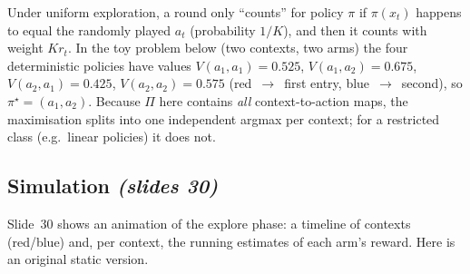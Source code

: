 \documentclass[11pt,a4paper]{article}
\newcommand{\slides}[1]{\emph{(slides #1)}}
\theoremstyle{plain}
\theoremstyle{definition}
\theoremstyle{remark}
\begin{document}
\begin{intuition}
Under uniform exploration, a round only ``counts'' for policy $\pi$ if $\pi(x_t)$ happens to equal the randomly played $a_t$ (probability $1/K$), and then it counts with weight $K r_t$.
In the toy problem below (two contexts, two arms) the four deterministic policies have values
$V(a_1,a_1)=0.525$, $V(a_1,a_2)=0.675$, $V(a_2,a_1)=0.425$, $V(a_2,a_2)=0.575$ (red~$\to$~first entry, blue~$\to$~second), so $\pi^\star=(a_1,a_2)$.
Because $\Pi$ here contains \emph{all} context-to-action maps, the maximisation splits into one independent argmax per context; for a restricted class (e.g.\ linear policies) it does not.
\end{intuition}

\subsection{Simulation \slides{30}}

Slide~30 shows an animation of the explore phase: a timeline of contexts (red/blue) and, per context, the running estimates of each arm's reward. Here is an original static version.
\end{document}
